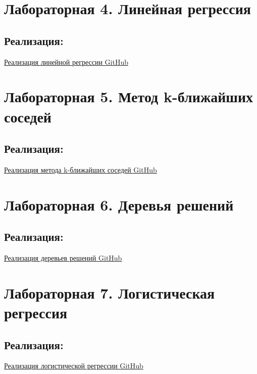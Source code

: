 \documentclass[12pt,onecolumn]{article}
\begin{document}
\section{Лабораторная 4. Линейная регрессия}
\subsection{Реализация:}
\href{https://github.com/AaLexUser/Artificial-intelligence-systems/blob/main/module-2/lab4/lab4.ipynb}{Реализация линейной регрессии GitHub}
\section{Лабораторная 5. Метод k-ближайших соседей}
\subsection{Реализация:}
\href{https://github.com/AaLexUser/Artificial-intelligence-systems/blob/main/module-2/lab5/lab5-new.ipynb}{Реализация метода k-ближайших соседей GitHub}
\section{Лабораторная 6. Деревья решений}
\subsection{Реализация:}
\href{https://github.com/AaLexUser/Artificial-intelligence-systems/blob/main/module-2/lab6/lab6.ipynb}{Реализация деревьев решений GitHub}
\section{Лабораторная 7.  Логистическая регрессия}
\subsection{Реализация:}
\href{https://github.com/AaLexUser/Artificial-intelligence-systems/blob/main/module-2/lab7/lab7.ipynb}{Реализация логистической регрессии GitHub}
\end{document}
